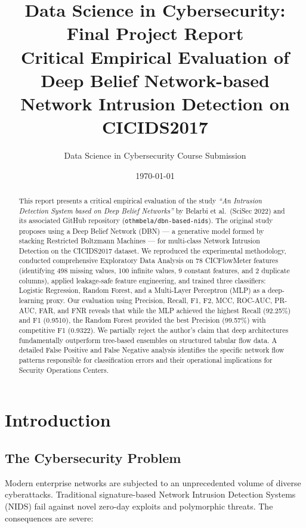 \documentclass[11pt,a4paper]{article}
\title{\textbf{Data Science in Cybersecurity: Final Project Report} \\ \Large Critical Empirical Evaluation of Deep Belief Network-based \\ Network Intrusion Detection on CICIDS2017}
\author{Data Science in Cybersecurity Course Submission}
\date{\today}
\begin{document}
\maketitle

\begin{abstract}
This report presents a critical empirical evaluation of the study \textit{``An Intrusion Detection System based on Deep Belief Networks''} by Belarbi et al.\ (SciSec 2022) and its associated GitHub repository (\texttt{othmbela/dbn-based-nids}). The original study proposes using a Deep Belief Network (DBN) --- a generative model formed by stacking Restricted Boltzmann Machines --- for multi-class Network Intrusion Detection on the CICIDS2017 dataset. We reproduced the experimental methodology, conducted comprehensive Exploratory Data Analysis on 78 CICFlowMeter features (identifying 498 missing values, 100 infinite values, 9 constant features, and 2 duplicate columns), applied leakage-safe feature engineering, and trained three classifiers: Logistic Regression, Random Forest, and a Multi-Layer Perceptron (MLP) as a deep-learning proxy. Our evaluation using Precision, Recall, F1, F2, MCC, ROC-AUC, PR-AUC, FAR, and FNR reveals that while the MLP achieved the highest Recall (92.25\%) and F1 (0.9510), the Random Forest provided the best Precision (99.57\%) with competitive F1 (0.9322). We partially reject the author's claim that deep architectures fundamentally outperform tree-based ensembles on structured tabular flow data. A detailed False Positive and False Negative analysis identifies the specific network flow patterns responsible for classification errors and their operational implications for Security Operations Centers.
\end{abstract}

\newpage
\tableofcontents
\newpage

\section{Introduction}

\subsection{The Cybersecurity Problem}
Modern enterprise networks are subjected to an unprecedented volume of diverse cyberattacks. Traditional signature-based Network Intrusion Detection Systems (NIDS) fail against novel zero-day exploits and polymorphic threats. The consequences are severe:
\end{document}
